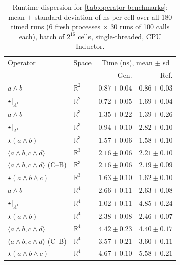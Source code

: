   \begin{table}[t]
    \centering
    \caption{Runtime dispersion for \cref{tab:operator-benchmarks}: mean $\pm$ standard
      deviation of ns per cell over all 180 timed runs (6 fresh processes $\times$ 30 runs of
      100 calls each), batch of $2^{16}$ cells, single-threaded, CPU Inductor.}
    \label{tab:operator-dispersion}
    \scriptsize
    \setlength{\tabcolsep}{3.5pt}
    \renewcommand{\arraystretch}{1.12}
    \setlength{\arrayrulewidth}{0.4pt}
    \begin{tabular}{|l|l|r|r|}
      \hline
      Operator & Space & \multicolumn{2}{c|}{Time (ns), mean $\pm$ sd} \\
      & & Gen. & Ref. \\
      \hline
      $a \wedge b$ & $\mathbb{R}^{2}$ & $0.87 \pm 0.04$ & $0.86 \pm 0.03$ \\ \hline
      $\star|_{\Lambda^{1}}$ & $\mathbb{R}^{2}$ & $0.72 \pm 0.05$ & $1.69 \pm 0.04$ \\ \hline
      $a \wedge b$ & $\mathbb{R}^{3}$ & $1.35 \pm 0.22$ & $1.39 \pm 0.26$ \\ \hline
      $\star|_{\Lambda^{1}}$ & $\mathbb{R}^{3}$ & $0.94 \pm 0.10$ & $2.82 \pm 0.10$ \\ \hline
      $\star(a \wedge b)$ & $\mathbb{R}^{3}$ & $1.57 \pm 0.06$ & $1.58 \pm 0.10$ \\ \hline
      $\langle a \wedge b,c \wedge d\rangle$ & $\mathbb{R}^{3}$ & $2.16 \pm 0.06$ & $2.21 \pm 0.10$ \\ \hline
      $\langle a \wedge b,c \wedge d\rangle$ (C--B) & $\mathbb{R}^{3}$ & $2.16 \pm 0.06$ & $2.19 \pm 0.09$ \\ \hline
      $\star(a \wedge b \wedge c)$ & $\mathbb{R}^{3}$ & $1.63 \pm 0.10$ & $1.62 \pm 0.10$ \\ \hline
      $a \wedge b$ & $\mathbb{R}^{4}$ & $2.66 \pm 0.11$ & $2.63 \pm 0.08$ \\ \hline
      $\star|_{\Lambda^{1}}$ & $\mathbb{R}^{4}$ & $1.02 \pm 0.11$ & $4.85 \pm 0.24$ \\ \hline
      $\star(a \wedge b)$ & $\mathbb{R}^{4}$ & $2.38 \pm 0.08$ & $2.46 \pm 0.07$ \\ \hline
      $\langle a \wedge b,c \wedge d\rangle$ & $\mathbb{R}^{4}$ & $4.42 \pm 0.23$ & $4.40 \pm 0.17$ \\ \hline
      $\langle a \wedge b,c \wedge d\rangle$ (C--B) & $\mathbb{R}^{4}$ & $3.57 \pm 0.21$ & $3.60 \pm 0.11$ \\ \hline
      $\star(a \wedge b \wedge c)$ & $\mathbb{R}^{4}$ & $4.67 \pm 0.10$ & $5.58 \pm 0.21$ \\ \hline
    \end{tabular}
  \end{table}
